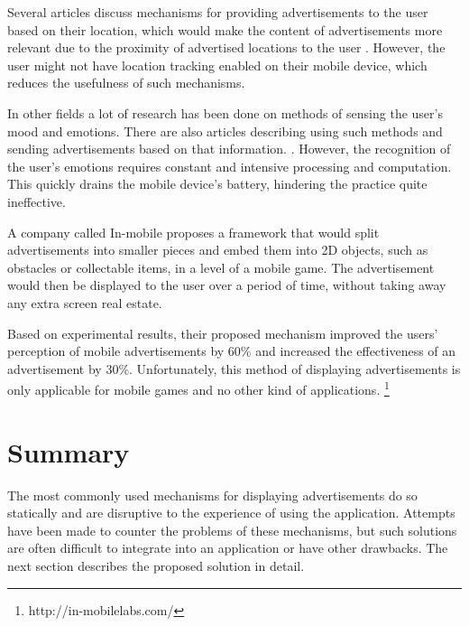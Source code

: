 Several articles discuss mechanisms for providing advertisements to the user based on their location, which would make the content of advertisements more relevant due to the proximity of advertised locations to the user \cite{hristova2004adme}\cite{aalto2004btandwap}. However, the user might not have location tracking enabled on their mobile device, which reduces the usefulness of such mechanisms.

In other fields a lot of research has been done on methods of sensing the user's mood and emotions\cite{geller2014howdoyoufeel}\cite{kiel2004frustration}. There are also articles describing using such methods and sending advertisements based on that information.  \cite{hristova2004adme}\cite{likamwa2013moodscope}. However, the recognition of the user's emotions requires constant and intensive processing and computation. This quickly drains the mobile device's battery, hindering the practice quite ineffective.

A company called In-mobile proposes a framework that would split advertisements into smaller pieces and embed them into 2D objects, such as obstacles or collectable items, in a level of a mobile game. The advertisement would then be displayed to the user over a period of time, without taking away any extra screen real estate.

Based on experimental results, their proposed mechanism improved the users' perception of mobile advertisements by 60\% and increased the effectiveness of an advertisement by 30\%. Unfortunately, this method of displaying advertisements is only applicable for mobile games and no other kind of applications. \footnote{http://in-mobilelabs.com/}

\section{Summary}

The most commonly used mechanisms for displaying advertisements do so statically and are disruptive to the experience of using the application. Attempts have been made to counter the problems of these mechanisms, but such solutions are often difficult to integrate into an application or have other drawbacks. The next section describes the proposed solution in detail.